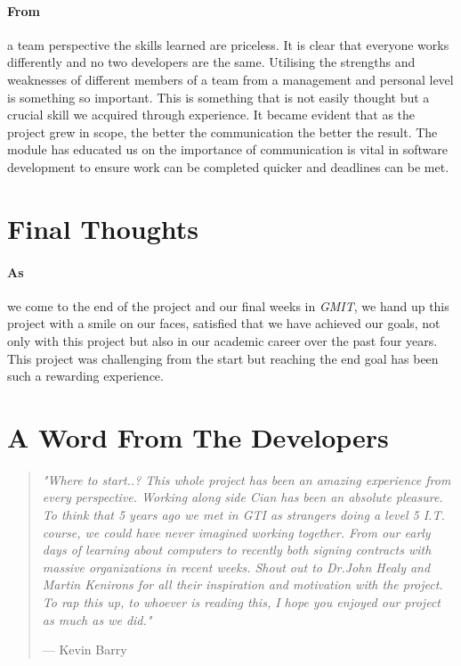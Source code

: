 \paragraph{From} a team perspective the skills learned are priceless. It is clear that everyone works differently and no two developers are the same. Utilising the strengths and weaknesses of different members of a team from a management and personal level is something so important. This is something that is not easily thought but a crucial skill we acquired through experience. It became evident that as the project grew in scope, the better the communication the better the result. The module has educated us on the importance of communication is vital in software development to ensure work can be completed quicker and deadlines can be met.

\section{Final Thoughts} 
\paragraph{As} we come to the end of the project and our final weeks in \textit{GMIT}, we hand up this project with a smile on our faces, satisfied that we have achieved our goals, not only with this project but also in our academic career over the past four years. This project was challenging from the start but reaching the end goal has been such a rewarding experience.

\section{A Word From The Developers}

\begin{quote}
\textit{"Where to start..? This whole project has been an amazing experience from every perspective. Working along side Cian has been an absolute pleasure. To think that 5 years ago we met in GTI as strangers doing a level 5 I.T. course, we could have never imagined working together. From our early days of learning about computers to recently both signing contracts with massive organizations in recent weeks. Shout out to Dr.John Healy and Martin Kenirons for all their inspiration and motivation with the project. To rap this up, to whoever is reading this, I hope you enjoyed our project as much as we did."}\par\raggedleft--- \textup{Kevin Barry}
\end{quote}

